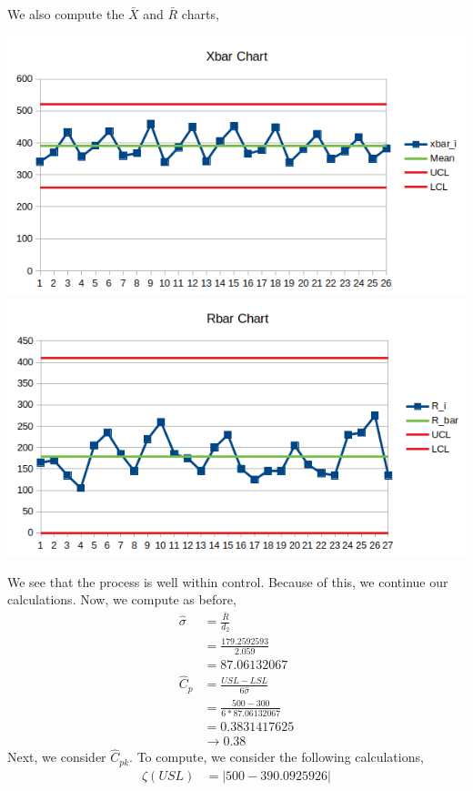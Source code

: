 \documentclass[letterpaper,10pt]{article}
\begin{document}
\begin{enumerate}
\begin{center}
\end{center}
We also compute the $\bar{X}$ and $\bar{R}$ charts,
\begin{center}
\includegraphics[scale=.75]{xbar.png}
\includegraphics[scale=.75]{rbar.png}
\end{center}
We see that the process is well within control. Because of this, we continue our calculations. Now, we compute as before,
\begin{align*}
\hat{\sigma} &= \frac{\bar{R}}{d_2}\\
&=\frac{179.2592593}{2.059}\\
&=87.06132067\\
\hat{C}_p&=\frac{USL-LSL}{6\hat{\sigma}}\\
&=\frac{500-300}{6*87.06132067}\\
&=0.3831417625\\
&\to 0.38
\end{align*}
Next, we consider $\hat{C}_{pk}$. To compute, we consider the following calculations,
\begin{align*}
\zeta(USL) &= |500-390.0925926|\\

\end{align*}
\end{enumerate}
\end{document}
